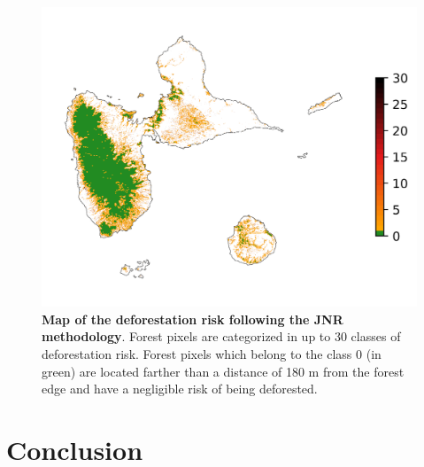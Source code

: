 \documentclass[paper=a4, 12pt, DIV=12]{scrartcl}
\begin{document}
\begin{figure}[H]
\centering
\includegraphics[width=0.8\linewidth]{outputs/endval/riskmap_ws5_ei_ev.png}
\caption{\label{fig:org39b9a3d}\textbf{Map of the deforestation risk following the JNR methodology}. Forest pixels are categorized in up to 30 classes of deforestation risk. Forest pixels which belong to the class 0 (in green) are located farther than a distance of 180 m from the forest edge and have a negligible risk of being deforested.}
\end{figure}

\section{Conclusion}
\label{sec:org043e4ec}
\end{document}
